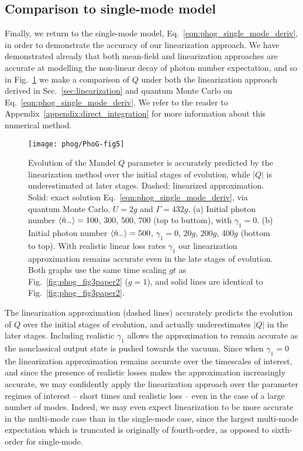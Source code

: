 \subsection{Comparison to single-mode model}
Finally, we return to the single-mode model, Eq.~\ref{eqn:phog_single_mode_deriv}, in order to demonstrate the accuracy of our linearization approach. We have demonstrated already that both mean-field and linearization approaches are accurate at modelling the non-linear decay of photon number expectation, and so in Fig.~\ref{fig:phog_single_mode_linearization} we make a comparison of $Q$ under both the linearization approach derived in Sec.~\ref{sec:linearization} and quantum Monte Carlo on Eq.~\ref{eqn:phog_single_mode_deriv}. We refer to the reader to Appendix~\ref{appendix:direct_integration} for more information about this numerical method.

\begin{figure}[htp]
\captionsetup{width=0.8\linewidth}
\centering
\texttt{[image: phog/PhoG-fig5]}
\caption{\label{fig:phog_single_mode_linearization} Evolution of the Mandel $Q$ parameter is accurately predicted by the linearization method over the initial stages of evolution, while $\left|Q\right|$ is underestimated at later stages. Dashed: linearized approximation. Solid: exact solution Eq.~\ref{eqn:phog_single_mode_deriv}, via quantum Monte Carlo. $U = 2g$ and $\Gamma = 432g$. (a) Initial photon number $\ev{\hat{n}_-} = 100$, $300$, $500$, $700$ (top to buttom), with $\gamma_1 = 0$. (b) Initial photon number $\ev{\hat{n}_-}=500$, $\gamma_1 = 0$, $20g$, $200g$, $400g$ (bottom to top). With realistic linear loss rates $\gamma_1$ our linearization approximation remains accurate even in the late stages of evolution. Both graphs use the same time scaling $g t$ as Fig.~\ref{fig:phog_fig3paper2} ($g=1$), and solid lines are identical to Fig.~\ref{fig:phog_fig3paper2}.}
\end{figure}

The linearization approximation (dashed lines) accurately predicts the evolution of $Q$ over the initial stages of evolution, and actually underestimates $\left|Q\right|$ in the later stages. Including realistic $\gamma_1$ allows the approximation to remain accurate as the nonclassical output state is pushed towards the vacuum. Since when $\gamma_1 = 0$ the linearization approximation remains accurate over the timescales of interest, and since the presence of realistic losses makes the approximation increasingly accurate, we may confidently apply the linearization approach over the parameter regimes of interest -- short times and realistic loss -- even in the case of a large number of modes. Indeed, we may even expect linearization to be more accurate in the multi-mode case than in the single-mode case, since the largest multi-mode expectation which is truncated is originally of fourth-order, as opposed to sixth-order for single-mode.

